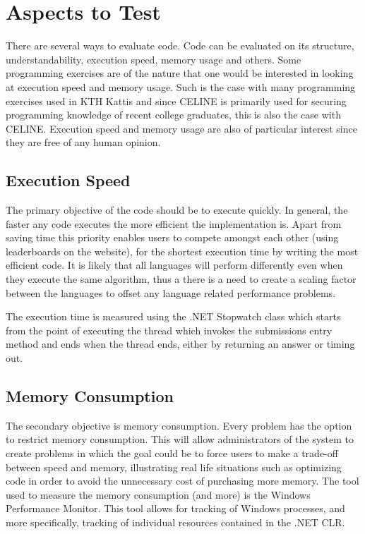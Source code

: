 \section{Aspects to Test}
There are several ways to evaluate code. Code can be evaluated on its structure, understandability, execution speed, memory usage and others. Some programming exercises are of the nature that one would be interested in looking at execution speed and memory usage. Such is the case with many programming exercises used in KTH Kattis \cite{Kattis} and since CELINE is primarily used for securing programming knowledge of recent college graduates, this is also the case with CELINE. Execution speed and memory usage are also of particular interest since they are free of any human opinion.

\subsection{Execution Speed}
The primary objective of the code should be to execute quickly. In general, the faster any code executes the more efficient the implementation is. Apart from saving time this priority enables users to compete amongst each other (using leaderboards on the website), for the shortest execution time by writing the most efficient code. It is likely that all languages will perform differently even when they execute the same algorithm, thus a there is a need to create a scaling factor between the languages to offset any language related performance problems.

The execution time is measured using the .NET Stopwatch class \cite{Stopwatch} which starts from the point of executing the thread which invokes the submissions entry method and ends when the thread ends, either by returning an answer or timing out.


\subsection{Memory Consumption}
The secondary objective is memory consumption. Every problem has the option to restrict memory consumption. This will allow administrators of the system to create problems in which the goal could be to force users to make a trade-off between speed and memory, illustrating real life situations such as optimizing code in order to avoid the unnecessary cost of purchasing more memory.
The tool used to measure the memory consumption (and more) is the Windows Performance Monitor. This tool allows for tracking of Windows processes, and more specifically, tracking of individual resources contained in the .NET CLR.

